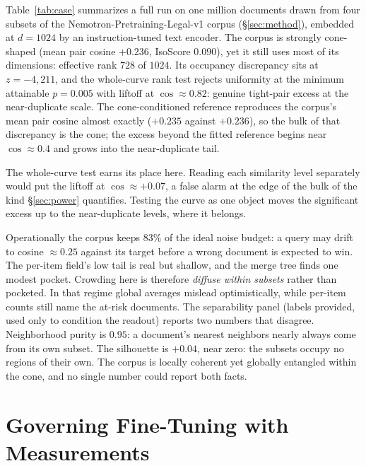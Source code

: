 \documentclass[11pt,letterpaper]{article}
\begin{document}
Table~\ref{tab:case} summarizes a full run on one million documents drawn
from four subsets of the Nemotron-Pretraining-Legal-v1 corpus
\cite{nemotronlegal} (\S\ref{sec:method}), embedded at $d = 1024$ by an
instruction-tuned text encoder. The corpus is strongly cone-shaped (mean
pair cosine $+0.236$, IsoScore $0.090$), yet it still uses most of its
dimensions: effective rank $728$ of $1024$. Its occupancy discrepancy sits
at $z = -4{,}211$, and the whole-curve rank test rejects uniformity at the
minimum attainable $p = 0.005$ with liftoff at $\cos \approx 0.82$:
genuine tight-pair excess at the near-duplicate scale. The cone-conditioned reference reproduces the corpus's mean pair
cosine almost exactly ($+0.235$ against $+0.236$), so the bulk of that
discrepancy is the cone; the excess beyond the fitted reference begins
near $\cos \approx 0.4$ and grows into the near-duplicate tail.

The whole-curve test earns its place here. Reading each similarity
level separately would put the liftoff at $\cos \approx +0.07$, a false
alarm at the edge of the bulk of the kind \S\ref{sec:power} quantifies.
Testing the curve as one object moves the significant excess up to the
near-duplicate levels, where it belongs.

Operationally the corpus keeps $83\%$ of the ideal noise budget: a query
may drift to cosine $\approx 0.25$ against its target before a wrong
document is expected to win. The per-item field's low tail is real but
shallow, and the merge tree finds one modest pocket. Crowding here is
therefore \emph{diffuse within subsets} rather than pocketed. In that
regime global averages mislead optimistically, while per-item counts still
name the at-risk documents. The separability panel (labels provided, used
only to condition the readout) reports two numbers that disagree.
Neighborhood purity is $0.95$: a document's nearest neighbors nearly
always come from its own subset. The silhouette is $+0.04$, near zero: the
subsets occupy no regions of their own. The corpus is locally coherent yet
globally entangled within the cone, and no single number could report both
facts.

\section{Governing Fine-Tuning with Measurements}
\label{sec:training}
\end{document}
